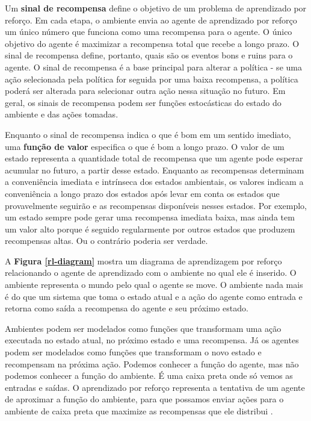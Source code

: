  Um \textbf{sinal de recompensa} define o objetivo de um problema de aprendizado por reforço. 
 Em cada etapa, o ambiente envia ao agente de aprendizado por reforço um único número que funciona como uma recompensa para o agente. 
 O único objetivo do agente é maximizar a recompensa total que recebe a longo prazo.
 O sinal de recompensa define, portanto, quais são os eventos bons e ruins para o agente. 
 O sinal de recompensa é a base principal para alterar a política - se uma ação selecionada pela política for seguida por uma baixa recompensa, a política poderá ser alterada para selecionar outra ação nessa situação no futuro. 
 Em geral, os sinais de recompensa podem ser funções estocásticas do estado do ambiente e das ações tomadas.

 Enquanto o sinal de recompensa indica o que é bom em um sentido imediato, uma \textbf{função de valor} especifica o que é bom a longo prazo. 
 O valor de um estado representa a quantidade total de recompensa que um agente pode esperar acumular no futuro, a partir desse estado. 
 Enquanto as recompensas determinam a conveniência imediata e intrínseca dos estados ambientais, os valores indicam a conveniência a longo prazo dos estados após levar em conta os estados que provavelmente seguirão e as recompensas disponíveis nesses estados. 
 Por exemplo, um estado sempre pode gerar uma recompensa imediata baixa, mas ainda tem um valor alto porque é seguido regularmente por outros estados que produzem recompensas altas. Ou o contrário poderia ser verdade. 

 A \textbf{Figura \ref{rl-diagram}} mostra um diagrama de aprendizagem por reforço relacionando o agente de aprendizado com o ambiente no qual ele é inserido.
 O ambiente representa o mundo pelo qual o agente se move. O ambiente nada mais é do que um sistema que toma o estado atual e a ação do agente como entrada e retorna como saída a recompensa do agente e seu próximo estado. 

 Ambientes podem ser modelados como funções que transformam uma ação executada no estado atual, no próximo estado e uma recompensa. Já os agentes podem ser modelados como funções que transformam o novo estado e recompensam na próxima ação. 
 Podemos conhecer a função do agente, mas não podemos conhecer a função do ambiente. É uma caixa preta onde só vemos as entradas e saídas. 
 O aprendizado por reforço representa a tentativa de um agente de aproximar a função do ambiente, para que possamos enviar ações para o ambiente de caixa preta que maximize as recompensas que ele distribui \cite{beg-guide-rl}.

